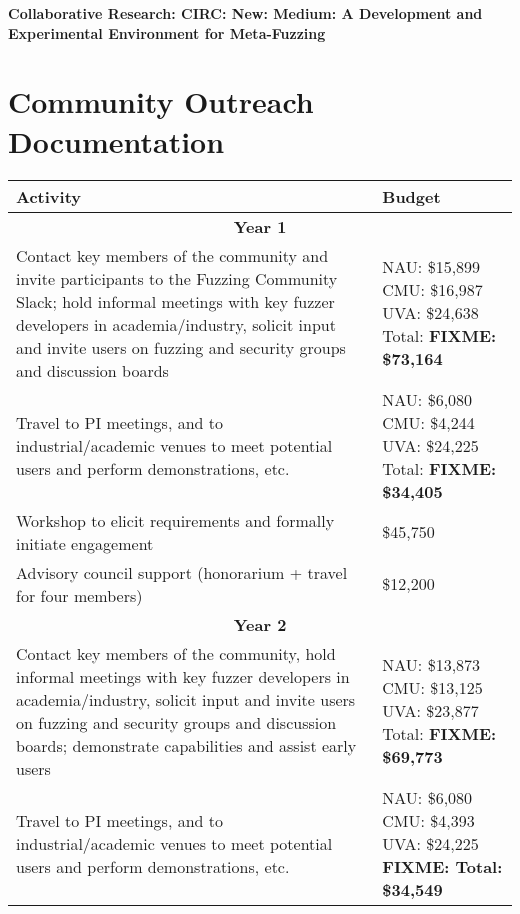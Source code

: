 \documentclass[12pt]{article}
\begin{document}
\begin{center} {\Large\sf\textbf{Collaborative Research: CIRC: New: Medium: A
      Development and Experimental Environment for Meta-Fuzzing}}
\end{center}

\section*{Community Outreach Documentation}


\begin{table}
  \begin{tabular}{|p{12cm}|p{3cm}|}
    \hline
    {\bf Activity} & {\bf Budget} \\
    \hline 
    \multicolumn{2}{c}{{\bf Year 1}} \\
    \hline
    Contact key members of the community and invite participants to the
    Fuzzing Community Slack; hold informal meetings with
    key fuzzer developers in academia/industry, solicit input and
    invite users
    on fuzzing and security groups and discussion boards &  NAU: \$15,899 CMU: \$16,987 UVA: \$24,638
                                                      Total: \textbf{FIXME: \$73,164} \\
    \hline
    Travel to PI meetings, and to industrial/academic venues to meet
    potential users and perform demonstrations, etc. & NAU: \$6,080
                                                       CMU: \$4,244 UVA:
                                                       \$24,225 Total: \textbf{FIXME: \$34,405}\\
    \hline
    Workshop to elicit requirements and formally initiate engagement
& \$45,750 \\
    \hline 
    Advisory council support (honorarium + travel for four members) 
  & \$12,200 \\
    \hline
    \hline
    \multicolumn{2}{c}{{\bf Year 2}} \\
    \hline
    \hline
    Contact key members of the community, hold informal meetings with
    key fuzzer developers in academia/industry, solicit input and
    invite users
    on fuzzing and security groups and discussion boards; demonstrate
    capabilities and assist early users&  NAU:  \$13,873 CMU:  \$13,125 UVA: \$23,877
                                                      Total: \textbf{FIXME: \$69,773}  \\
    \hline
    Travel to PI meetings, and to industrial/academic venues to meet
    potential users and perform demonstrations, etc. & NAU: \$6,080 CMU: \$4,393 UVA:  \$24,225 \textbf{FIXME: Total: \$34,549}\\

\end{tabular}
\end{table}
\end{document}
